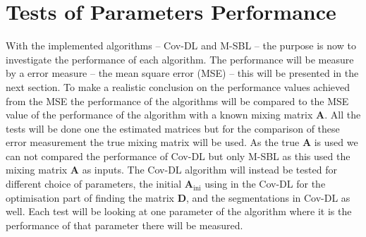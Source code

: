 \section{Tests of Parameters Performance}
With the implemented algorithms -- Cov-DL and M-SBL -- the purpose is now to investigate the performance of each algorithm. The performance will be measure by a error measure -- the mean square error (MSE) -- this will be presented in the next section. To make a realistic conclusion on the performance values achieved from the MSE the performance of the algorithms will be compared to the MSE value of the performance of the algorithm with a known mixing matrix $\mathbf{A}$. All the tests will be done one the estimated matrices but for the comparison of these error measurement the true mixing matrix will be used. As the true $\mathbf{A}$ is used we can not compared the performance of Cov-DL but only M-SBL as this used the mixing matrix $\mathbf{A}$ as inputs. The Cov-DL algorithm will instead be tested for different choice of parameters, the initial $\mathbf{A}_{\text{ini}}$ using in the Cov-DL for the optimisation part of finding the matrix $\mathbf{D}$, and the segmentations in Cov-DL as well.
Each test will be looking at one parameter of the algorithm where it is the performance of that parameter there will be measured.

